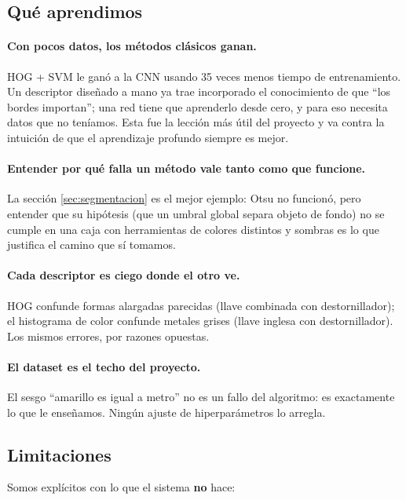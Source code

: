\documentclass[11pt,a4paper]{article}
\begin{document}
\subsection{Qué aprendimos}

\paragraph{Con pocos datos, los métodos clásicos ganan.}
HOG + SVM le ganó a la CNN usando 35 veces menos tiempo de entrenamiento. Un descriptor diseñado a
mano ya trae incorporado el conocimiento de que \enquote{los bordes importan}; una red tiene que
aprenderlo desde cero, y para eso necesita datos que no teníamos. Esta fue la lección más útil del
proyecto y va contra la intuición de que el aprendizaje profundo siempre es mejor.

\paragraph{Entender por qué falla un método vale tanto como que funcione.}
La sección \ref{sec:segmentacion} es el mejor ejemplo: Otsu no funcionó, pero entender que su
hipótesis (que un umbral global separa objeto de fondo) no se cumple en una caja con herramientas
de colores distintos y sombras es lo que justifica el camino que sí tomamos.

\paragraph{Cada descriptor es ciego donde el otro ve.}
HOG confunde formas alargadas parecidas (llave combinada con destornillador); el histograma de
color confunde metales grises (llave inglesa con destornillador). Los mismos errores, por razones
opuestas.

\paragraph{El dataset es el techo del proyecto.}
El sesgo \enquote{amarillo es igual a metro} no es un fallo del algoritmo: es exactamente lo que le
enseñamos. Ningún ajuste de hiperparámetros lo arregla.

\subsection{Limitaciones}

Somos explícitos con lo que el sistema \textbf{no} hace:
\end{document}
